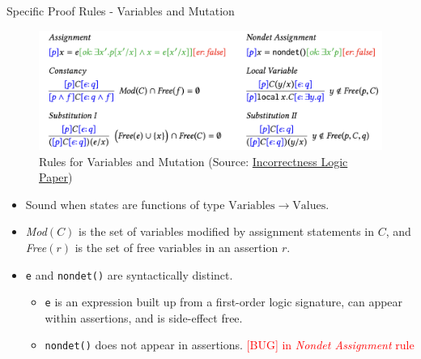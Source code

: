 \documentclass[
  10pt,
  ignorenonframetext,
]{beamer}
\providecommand{\tightlist}{%
  \setlength{\itemsep}{0pt}\setlength{\parskip}{0pt}}
\newcommand{\red}[1]{\textcolor{red}{#1}}
\newcommand{\Vars}{\mathrm{Variables}}
\newcommand{\Vals}{\mathrm{Values}}
\begin{document}
\begin{frame}[fragile]{Specific Proof Rules - Variables and Mutation}
\label{specific-proof-rules---variables-and-mutation-1}
\begin{figure}
\centering
\includegraphics[width=\textwidth,height=0.3\textheight]{images/specific.png}
\caption{Rules for Variables and Mutation (Source:
\href{https://dl.acm.org/doi/10.1145/3371078}{Incorrectness Logic
Paper})}
\end{figure}

\begin{itemize}
\item
  Sound when states are functions of type \(\Vars \to \Vals\).
\item
  \emph{Mod}\((C)\) is the set of variables modified by assignment
  statements in \(C\), and \emph{Free}\((r)\) is the set of free
  variables in an assertion \(r\).
\item
  \texttt{e} and \texttt{nondet()} are syntactically distinct.

  \begin{itemize}
  \tightlist
  \item
    \texttt{e} is an expression built up from a first-order logic
    signature, can appear within assertions, and is side-effect free.
  \item
    \texttt{nondet()} does not appear in assertions.
    \red{[BUG] in \emph{Nondet Assignment} rule}
  \end{itemize}
\end{itemize}
\end{frame}
\end{document}
